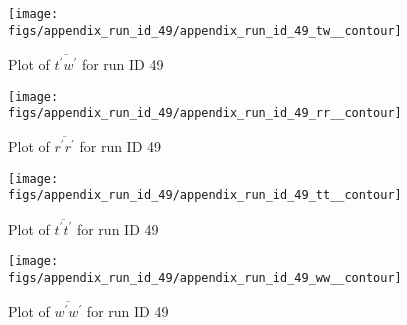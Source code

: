 \begin{figure}[H]
\centering
\texttt{[image: figs/appendix\_run\_id\_49/appendix\_run\_id\_49\_tw\_\_contour]}
\caption{Plot of $\overline{t^\prime w^\prime}$ for run ID 49}
\label{fig:appendix_run_id_49_tw__contour}
\end{figure}


\begin{figure}[H]
\centering
\texttt{[image: figs/appendix\_run\_id\_49/appendix\_run\_id\_49\_rr\_\_contour]}
\caption{Plot of $\overline{r^\prime r^\prime}$ for run ID 49}
\label{fig:appendix_run_id_49_rr__contour}
\end{figure}


\begin{figure}[H]
\centering
\texttt{[image: figs/appendix\_run\_id\_49/appendix\_run\_id\_49\_tt\_\_contour]}
\caption{Plot of $\overline{t^\prime t^\prime}$ for run ID 49}
\label{fig:appendix_run_id_49_tt__contour}
\end{figure}


\begin{figure}[H]
\centering
\texttt{[image: figs/appendix\_run\_id\_49/appendix\_run\_id\_49\_ww\_\_contour]}
\caption{Plot of $\overline{w^\prime w^\prime}$ for run ID 49}
\label{fig:appendix_run_id_49_ww__contour}
\end{figure}


